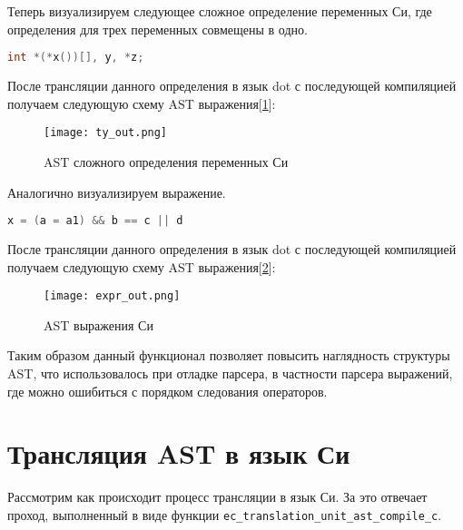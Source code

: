 
\clearpage
Теперь визуализируем следующее сложное определение переменных Си, где определения для трех переменных совмещены в одно.
\begin{lstlisting}[language=c]
int *(*x())[], y, *z;
\end{lstlisting}

После трансляции данного определения в язык dot с последующей компиляцией
получаем следующую схему AST выражения[\ref{graphviz:decl}]:

\begin{figure}[h!]
    \texttt{[image: ty\_out.png]}
    \centering
    \caption{AST сложного определения переменных Си}
    \label{graphviz:decl}
\end{figure}

\clearpage
Аналогично визуализируем выражение.
\begin{lstlisting}[language=c]
x = (a = a1) && b == c || d
\end{lstlisting}

После трансляции данного определения в язык dot с последующей компиляцией
получаем следующую схему AST выражения[\ref{graphviz:expr}]:
\begin{figure}[h!]
    \texttt{[image: expr\_out.png]}
    \centering
    \caption{AST выражения Си}
    \label{graphviz:expr}
\end{figure}

Таким образом данный функционал позволяет повысить наглядность структуры AST, что использовалось при отладке парсера, в частности парсера выражений, где можно ошибиться с порядком следования операторов.








\section{Трансляция AST в язык Си}
\label{pass:compile-c}


Рассмотрим как происходит процесс трансляции в язык Си. За это отвечает проход, выполненный в виде функции \hfill\break\verb|ec_translation_unit_ast_compile_c|.

